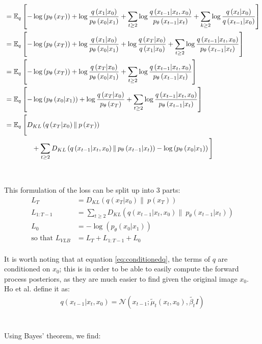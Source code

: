 \documentclass[twoside]{article}
\numberwithin{equation}{section}
\numberwithin{figure}{section}
\begin{document}
\begin{align}
  &= \mathbb{E}_q \left[-\log\left(p_{\theta}\left(x_T\right)\right) + \log \frac{q\left(x_1 | x_0\right)}{p_{\theta}\left(x_0 | x_1\right)} + \sum_{t \geq 2} \log \frac{q\left(x_{t-1} | x_t, x_0\right)}{p_{\theta}\left(x_{t-1} | x_t\right)} + \sum_{k \geq 2} \log \frac{q\left(x_t | x_0\right)}{q\left(x_{t-1} | x_0\right)}\right] \\
  &= \mathbb{E}_q \left[-\log\left(p_{\theta}\left(x_T\right)\right) + \log \frac{q\left(x_1 | x_0\right)}{p_{\theta}\left(x_0 | x_1\right)} + \log \frac{q\left(x_T | x_0\right)}{q\left(x_1 | x_0\right)} + \sum_{t \geq 2} \log \frac{q\left(x_{t-1} | x_t, x_0\right)}{p_{\theta}\left(x_{t-1} | x_t\right)}\right] \\
  &= \mathbb{E}_q \left[-\log\left(p_{\theta}\left(x_T\right)\right) + \log \frac{q\left(x_T | x_0\right)}{p_{\theta}\left(x_0 | x_1\right)} + \sum_{t \geq 2} \log \frac{q\left(x_{t-1} | x_t, x_0\right)}{p_{\theta}\left(x_{t-1} | x_t\right)}\right] \\
  &= \mathbb{E}_q \left[- \log\left(p_{\theta}\left(x_0 | x_1\right)\right) + \log \frac{q\left(x_T | x_0\right)}{p_{\theta}\left(x_T\right)} + \sum_{t \geq 2} \log \frac{q\left(x_{t-1} | x_t, x_0\right)}{p_{\theta}\left(x_{t-1} | x_t\right)}\right] \\
  &= \mathbb{E}_q \: \Bigg[ D_{KL}\left(q\left(x_T | x_0\right) \| \: p\left(x_T\right)\right) \Bigg.  \\
  &\qquad \qquad \Bigg. + \sum_{t \geq 2} D_{KL}\left(q\left(x_{t-1} | x_t, x_0\right) \| \: p_{\theta}\left(x_{t-1} | x_t\right)\right) - \log\left(p_{\theta}\left(x_0 | x_1\right)\right) \Bigg] \notag
\end{align}
\\\\
This formulation of the loss can be split up into 3 parts:
\begin{align}
  L_T &= D_{KL}\left(q\left(x_T | x_0\right) \| \: p\left(x_T\right)\right) \\
  L_{1:T-1} &= \sum_{t \geq 2} D_{KL}\left(q\left(x_{t-1} | x_t, x_0\right) \| \: p_{\theta}\left(x_{t-1} | x_t\right)\right) \\
  L_0 &=  - \log\left(p_{\theta}\left(x_0 | x_1\right)\right) \\
  \text{so that } L_{VLB} &= L_T + L_{1:T-1} + L_0
\end{align}
\\
It is worth noting that at equation \ref{eq:conditionedq}, the terms of $q$ are conditioned on $x_0$; this is in order to be able to easily compute the forward process posteriors, as they are much easier to find given the original image $x_0$. \\
Ho et al. \cite{ho2020denoising} define it as:
\begin{gather}
  q\left(x_{t-1} | x_t, x_0\right) = \mathcal{N}\left(x_{t-1}; \tilde{\mu}_t \left(x_t, x_0\right), \tilde{\beta_t} I\right)
\end{gather}
\\\\
Using Bayes' theorem, we find:
\end{document}
